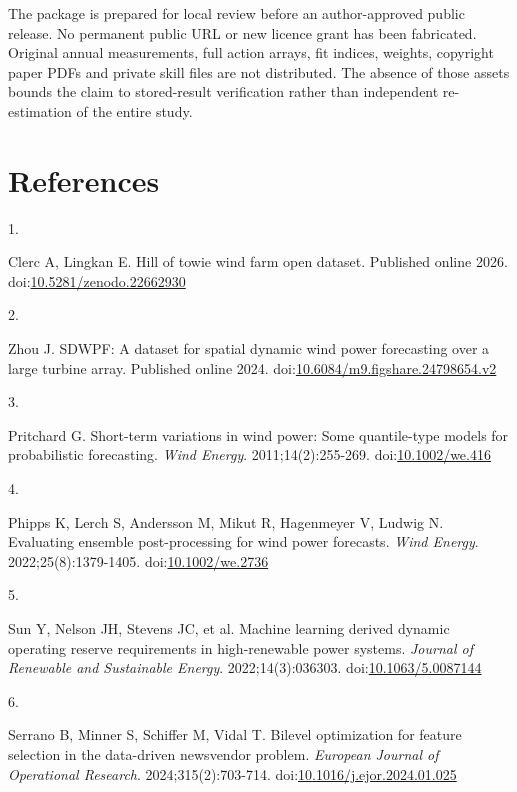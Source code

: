 \documentclass[
  british,
  11pt,
]{article}
\newlength{\cslhangindent}
\newlength{\csllabelwidth}
\newenvironment{CSLReferences}[2] %
 {\begin{list}{}{%
  \setlength{\itemindent}{0pt}
  \setlength{\leftmargin}{0pt}
  \setlength{\parsep}{0pt}
  \ifodd #1
   \setlength{\leftmargin}{\cslhangindent}
   \setlength{\itemindent}{-1\cslhangindent}
  \fi
  \setlength{\itemsep}{#2\baselineskip}}}
 {\end{list}}
\newcommand{\CSLLeftMargin}[1]{\parbox[t]{\csllabelwidth}{\strut#1\strut}}
\newcommand{\CSLRightInline}[1]{\parbox[t]{\linewidth - \csllabelwidth}{\strut#1\strut}}
\begin{document}
The package is prepared for local review before an author-approved
public release. No permanent public URL or new licence grant has been
fabricated. Original annual measurements, full action arrays, fit
indices, weights, copyright paper PDFs and private skill files are not
distributed. The absence of those assets bounds the claim to
stored-result verification rather than independent re-estimation of the
entire study.

\section*{References}\label{references}

\protect{}\label{refs}
\begin{CSLReferences}{0}{1}
\CSLLeftMargin{1. }%
\CSLRightInline{Clerc A, Lingkan E. Hill of towie wind farm open
dataset. Published online 2026.
doi:\href{https://doi.org/10.5281/zenodo.22662930}{10.5281/zenodo.22662930}}

\CSLLeftMargin{2. }%
\CSLRightInline{Zhou J. {SDWPF}: A dataset for spatial dynamic wind
power forecasting over a large turbine array. Published online 2024.
doi:\href{https://doi.org/10.6084/m9.figshare.24798654.v2}{10.6084/m9.figshare.24798654.v2}}

\CSLLeftMargin{3. }%
\CSLRightInline{Pritchard G. Short-term variations in wind power: Some
quantile-type models for probabilistic forecasting. \emph{Wind Energy}.
2011;14(2):255-269.
doi:\href{https://doi.org/10.1002/we.416}{10.1002/we.416}}

\CSLLeftMargin{4. }%
\CSLRightInline{Phipps K, Lerch S, Andersson M, Mikut R, Hagenmeyer V,
Ludwig N. Evaluating ensemble post-processing for wind power forecasts.
\emph{Wind Energy}. 2022;25(8):1379-1405.
doi:\href{https://doi.org/10.1002/we.2736}{10.1002/we.2736}}

\CSLLeftMargin{5. }%
\CSLRightInline{Sun Y, Nelson JH, Stevens JC, et al. Machine learning
derived dynamic operating reserve requirements in high-renewable power
systems. \emph{Journal of Renewable and Sustainable Energy}.
2022;14(3):036303.
doi:\href{https://doi.org/10.1063/5.0087144}{10.1063/5.0087144}}

\CSLLeftMargin{6. }%
\CSLRightInline{Serrano B, Minner S, Schiffer M, Vidal T. Bilevel
optimization for feature selection in the data-driven newsvendor
problem. \emph{European Journal of Operational Research}.
2024;315(2):703-714.
doi:\href{https://doi.org/10.1016/j.ejor.2024.01.025}{10.1016/j.ejor.2024.01.025}}


\end{CSLReferences}
\end{document}
